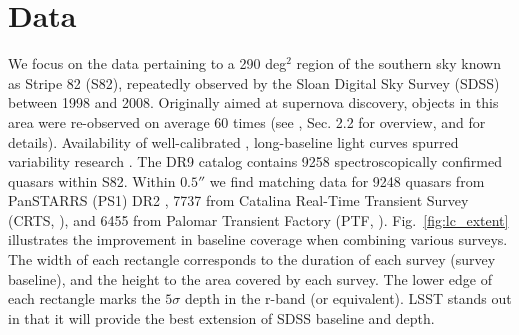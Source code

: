 \documentclass[twocolumn]{aastex62}
\begin{document}
%
%
%
%
\section{Data}
\label{sec:data}

We focus on the data pertaining to a 290 deg$^{2}$ region of the southern sky known as Stripe 82 (S82), repeatedly observed by the Sloan Digital Sky Survey (SDSS) between 1998 and 2008. Originally aimed at supernova discovery, objects in this area were re-observed on average 60 times (see \citealt{macleod2012}, Sec. 2.2 for overview, and \citealt{annis2014} for details). Availability of well-calibrated \citep{ivezic2007}, long-baseline light curves spurred variability research \citep{sesar2007}. The DR9 catalog \citep{schneider2008} contains 9258 spectroscopically confirmed quasars within S82. Within  $0.5 ''$  we find matching data for 9248 quasars from  PanSTARRS (PS1) DR2 \citep{chambers2011,flewelling2018}, 7737 from Catalina Real-Time Transient Survey (CRTS, \citealt{drake2009}), and  6455 from Palomar Transient Factory (PTF, \citealt{rau2009}). Fig.~\ref{fig:lc_extent} illustrates the improvement in baseline coverage when combining various surveys. The width of each rectangle corresponds to the duration of each survey (survey baseline), and the height to the area covered by each survey. The lower edge of each rectangle marks the $5\sigma$ depth in the r-band (or equivalent). LSST stands out in that it will provide the best extension of SDSS baseline and depth.  


\begin{figure*} %
	\caption{An illustration of survey baseline, sky area covered, and depth. The width of each rectangle corresponds to the extent of real or simulated light curves for Stripe 82 quasars for each survey. This includes SDSS DR7, CRTS DR2, PS1 DR2, PTF DR2, ZTF DR1, and for LSST the full 10-year survey. The lower edge of each rectangle (marked by a  thick dashed line) corresponds to the $5\sigma$ limiting magnitude (SDSS $r$, PS1 $r$, PTF $R$, ZTF $r$, LSST $r$, CRTS $V$). The vertical extent of each rectangle corresponds to the total survey area (for SDSS, up to DR15).  Note how PS1 and PTF extend the baseline of SDSS by approximately $50\%$, and how inclusion of LSST roughly triples the SDSS baseline. For reference, the area covered by LSST is $20 000$ sq.deg.}
	\label{fig:lc_extent}
\end{figure*} 
\end{document}

